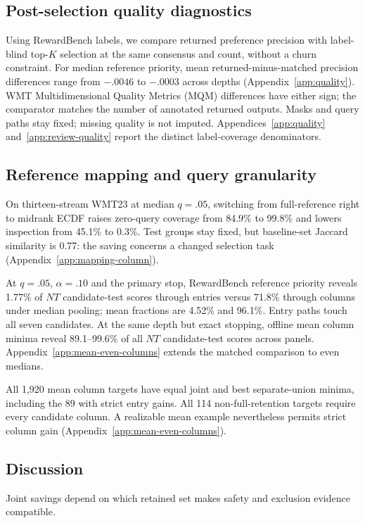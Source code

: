 \documentclass[11pt]{article}
\begin{document}
\subsection{Post-selection quality diagnostics}
Using RewardBench labels, we compare returned preference precision with label-blind top-$K$ selection at the same consensus and count, without a churn constraint. For median reference priority, mean returned-minus-matched precision differences range from $-.0046$ to $-.0003$ across depths (Appendix~\ref{app:quality}). WMT Multidimensional Quality Metrics (MQM) differences have either sign; the comparator matches the number of annotated returned outputs. Masks and query paths stay fixed; missing quality is not imputed. Appendices~\ref{app:quality} and~\ref{app:review-quality} report the distinct label-coverage denominators.

\subsection{Reference mapping and query granularity}
On thirteen-stream WMT23 at median $q=.05$, switching from full-reference right to midrank ECDF raises zero-query coverage from 84.9\% to 99.8\% and lowers inspection from 45.1\% to 0.3\%. Test groups stay fixed, but baseline-set Jaccard similarity is 0.77: the saving concerns a changed selection task (Appendix~\ref{app:mapping-column}).

At $q=.05$, $\alpha=.10$ and the primary stop, RewardBench reference priority reveals 1.77\% of $NT$ candidate-test scores through entries versus 71.8\% through columns under median pooling; mean fractions are 4.52\% and 96.1\%. Entry paths touch all seven candidates. At the same depth but exact stopping, offline mean column minima reveal 89.1--99.6\% of all $NT$ candidate-test scores across panels. Appendix~\ref{app:mean-even-columns} extends the matched comparison to even medians.

All 1,920 mean column targets have equal joint and best separate-union minima, including the 89 with strict entry gains. All 114 non-full-retention targets require every candidate column. A realizable mean example nevertheless permits strict column gain (Appendix~\ref{app:mean-even-columns}).

\subsection{Discussion}
Joint savings depend on which retained set makes safety and exclusion evidence compatible.
\end{document}
